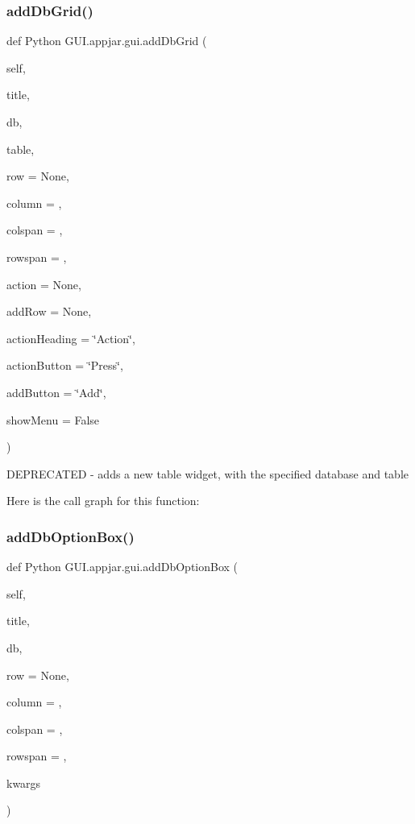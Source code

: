 \subsubsection{\texorpdfstring{add\+Db\+Grid()}{addDbGrid()}}
{\footnotesize\ttfamily def Python G\+U\+I.\+appjar.\+gui.\+add\+Db\+Grid (\begin{DoxyParamCaption}\item[{}]{self,  }\item[{}]{title,  }\item[{}]{db,  }\item[{}]{table,  }\item[{}]{row = {\ttfamily None},  }\item[{}]{column = {},  }\item[{}]{colspan = {},  }\item[{}]{rowspan = {},  }\item[{}]{action = {\ttfamily None},  }\item[{}]{add\+Row = {\ttfamily None},  }\item[{}]{action\+Heading = {\ttfamily \char`\"{}Action\char`\"{}},  }\item[{}]{action\+Button = {\ttfamily \char`\"{}Press\char`\"{}},  }\item[{}]{add\+Button = {\ttfamily \char`\"{}Add\char`\"{}},  }\item[{}]{show\+Menu = {\ttfamily False} }\end{DoxyParamCaption})}

\begin{DoxyVerb}DEPRECATED - adds a new table widget, with the specified database and table \end{DoxyVerb}
 Here is the call graph for this function\+:
\mbox{\label{class_python_01_g_u_i_1_1appjar_1_1gui_acf9b4b332eec8e36c03273dd8c2afc0d}} 
\subsubsection{\texorpdfstring{add\+Db\+Option\+Box()}{addDbOptionBox()}}
{\footnotesize\ttfamily def Python G\+U\+I.\+appjar.\+gui.\+add\+Db\+Option\+Box (\begin{DoxyParamCaption}\item[{}]{self,  }\item[{}]{title,  }\item[{}]{db,  }\item[{}]{row = {\ttfamily None},  }\item[{}]{column = {},  }\item[{}]{colspan = {},  }\item[{}]{rowspan = {},  }\item[{}]{kwargs }\end{DoxyParamCaption})}

